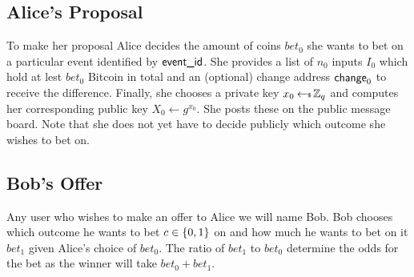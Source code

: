 \documentclass{article}
\theoremstyle{definition}
\begin{document}
\subsection{Alice's Proposal}

To make her proposal Alice decides the amount of coins $bet_0$ she wants to bet on a particular event identified by $\textsf{event\_id}$. She provides a list of $n_0$ inputs $I_0$ which hold at lest $bet_0$ Bitcoin in total and an (optional) change address $\textsf{change}_0$ to receive the difference. Finally, she chooses a private key $x_0 \hskip2.3pt{\gets\!\!\mbox{\tiny${\$}$\normalsize}}\, \mathbb{Z}_q$ and computes her corresponding public key $X_0 \gets g^{x_0}$. She posts these on the public message board. Note that she does not yet have to decide publicly which outcome she wishes to bet on.

\begin{center}
\end{center}


\newcommand{\Enc}{\textsf{Enc}}
\newcommand{\Dec}{\textsf{Dec}}
\newcommand{\VrfyWitness}{\textsf{VerifyWitness}}
\newcommand{\GenFund}{\textsf{GenFund}}
\newcommand{\GenWitness}{\textsf{Witness}}

\subsection{Bob's Offer}

Any user who wishes to make an offer to Alice we will name Bob. Bob chooses which outcome he wants to bet $c \in \{0,1\}$ on and how much he wants to bet on it $bet_1$ given Alice's choice of $bet_0$. The ratio of $bet_1$ to $bet_0$ determine the odds for the bet as the winner will take $bet_0 + bet_1$.
\end{document}
